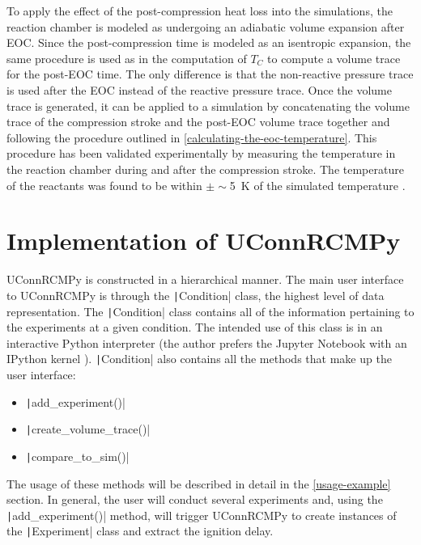 \documentclass[12pt]{../ussci}
\begin{document}
To apply the effect of the post-compression heat loss into the
simulations, the reaction chamber is modeled as undergoing an adiabatic
volume expansion after EOC. Since the post-compression time is modeled as an
isentropic expansion, the same procedure is used as in the computation
of \(T_C\) to compute a volume trace for the post-EOC time. The only
difference is that the non-reactive pressure trace is used after the EOC
instead of the reactive pressure trace. Once the volume trace is
generated, it can be applied to a simulation by concatenating the volume
trace of the compression stroke and the post-EOC volume trace together
and following the procedure outlined in \cref{calculating-the-eoc-temperature}.
This procedure has been validated experimentally by measuring the temperature
in the reaction chamber during and after the compression stroke. The
temperature of the reactants was found to be within $\pm\sim $\SI{5}{\K} of the
simulated temperature \autocite{Das2012a,Uddi2012}.

\section{Implementation of UConnRCMPy}\label{implementation-of-uconnrcmpy}

UConnRCMPy is constructed in a hierarchical manner. The main user
interface to UConnRCMPy is through the \texttt|Condition| class, the
highest level of data representation. The \texttt|Condition| class
contains all of the information pertaining to the experiments at a given
condition. The intended use of this class is in an interactive Python
interpreter (the author prefers the Jupyter Notebook with an IPython
kernel \autocite{Perez2007}). \texttt|Condition| also contains all the
methods that make up the user interface:

\begin{itemize}
\item
  \texttt|add_experiment()|
\item
  \texttt|create_volume_trace()|
\item
  \texttt|compare_to_sim()|
\end{itemize}

The usage of these methods will be described in detail in the
\cref{usage-example} section. In general, the user will
conduct several experiments and, using the \texttt|add_experiment()|
method, will trigger UConnRCMPy to create instances of the
\texttt|Experiment| class and extract the ignition delay.
\end{document}
